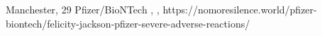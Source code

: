           {Manchester,}
          {29}
          {Pfizer/BioNTech}
          {}
          {
            ,
            ,
          }
          {https://nomoresilence.world/pfizer-biontech/felicity-jackson-pfizer-severe-adverse-reactions/}

